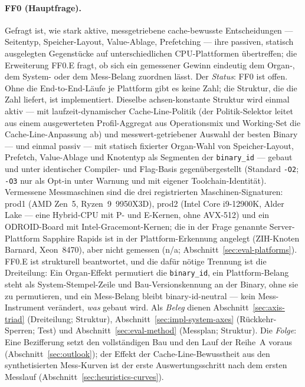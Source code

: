\begin{nurlang}
\paragraph{FF0 (Hauptfrage).} Gefragt ist, wie stark aktive, messgetriebene cache-bewusste
Entscheidungen --- Seitentyp, Speicher-Layout, Value-Ablage, Prefetching --- ihre passiven, statisch
ausgelegten Gegenstücke auf unterschiedlichen CPU-Plattformen übertreffen; die Erweiterung FF0.E fragt,
ob sich ein gemessener Gewinn eindeutig dem Organ-, dem System- oder dem Mess-Belang zuordnen lässt.
Der \emph{Status}: FF0 ist offen. Ohne die End-to-End-Läufe je Plattform gibt es keine Zahl; die Struktur,
die die Zahl liefert, ist implementiert. Dieselbe achsen-konstante Struktur wird einmal aktiv --- mit
laufzeit-dynamischer Cache-Line-Politik (der Politik-Selektor leitet aus einem ausgewerteten
Profil-Aggregat aus Operationsmix und Working-Set die Cache-Line-Anpassung ab) und messwert-getriebener
Auswahl der besten Binary --- und einmal passiv --- mit statisch fixierter Organ-Wahl von
Speicher-Layout, Prefetch, Value-Ablage und Knotentyp als Segmenten der \texttt{binary\_id} --- gebaut
und unter identischer Compiler- und Flag-Basis gegenübergestellt (Standard \texttt{-O2};
\texttt{-O3} nur als Opt-in unter Warnung und mit eigener Toolchain-Identität). Vermessene Messmaschinen sind
die drei registrierten Maschinen-Signaturen: prod1 (AMD Zen~5, Ryzen~9~9950X3D), prod2 (Intel Core %
i9-12900K, Alder Lake --- eine Hybrid-CPU mit P- und E-Kernen, ohne AVX-512) und ein ODROID-Board mit
Intel-Gracemont-Kernen; die in der Frage genannte Server-Plattform Sapphire Rapids ist in der
Plattform-Erkennung angelegt (ZIH-Knoten Barnard, Xeon~8470), aber nicht gemessen (n/a;
Abschnitt~\ref{sec:eval-platforms}). FF0.E ist strukturell beantwortet, und die dafür nötige Trennung ist
die Dreiteilung: Ein Organ-Effekt permutiert die \texttt{binary\_id}, ein Plattform-Belang steht als
System-Stempel-Zeile und Bau-Versionskennung an der Binary, ohne sie zu permutieren, und ein Mess-Belang
bleibt binary-id-neutral --- kein Mess-Instrument verändert, \emph{was} gebaut wird. Als
\emph{Beleg} dienen Abschnitt~\ref{sec:axis-triad} (Dreiteilung; Struktur),
Abschnitt~\ref{sec:impl-system-axes}
(Rückkehr-Sperren; Test) und Abschnitt~\ref{sec:eval-method} (Messplan; Struktur). Die \emph{Folge}: Eine
Bezifferung setzt den vollständigen Bau und den Lauf der Reihe~A voraus (Abschnitt~\ref{sec:outlook}); der
Effekt der Cache-Line-Bewusstheit aus den synthetisierten Mess-Kurven ist der erste Auswertungsschritt
nach dem ersten Messlauf (Abschnitt~\ref{sec:heuristics-curves}).
\end{nurlang}
